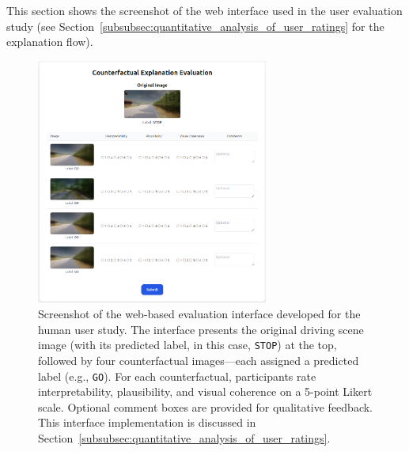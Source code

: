 This section shows the screenshot of the web interface used in the user evaluation study (see Section~\ref{subsubsec:quantitative_analysis_of_user_ratings} for the explanation flow).

\vspace{-0.5em}

\begin{figure}[h]
    \centering
    \captionsetup{font=small,skip=4pt}
    \includegraphics[width=0.68\textwidth]{img/web_app_screenshots/grading.png}
    \caption{Screenshot of the web-based evaluation interface developed for the human user study. The interface presents the original driving scene image (with its predicted label, in this case, \texttt{STOP}) at the top, followed by four counterfactual images—each assigned a predicted label (e.g., \texttt{GO}). For each counterfactual, participants rate interpretability, plausibility, and visual coherence on a 5-point Likert scale. Optional comment boxes are provided for qualitative feedback. This interface implementation is discussed in Section~\ref{subsubsec:quantitative_analysis_of_user_ratings}.}
    \label{fig:app:grading}
\end{figure}


